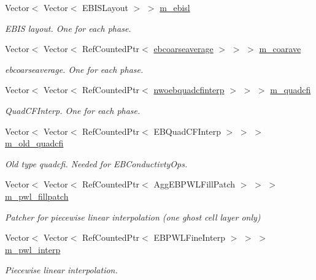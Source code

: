 \begin{DoxyCompactItemize}
Vector$<$ Vector$<$ E\+B\+I\+S\+Layout $>$ $>$ \hyperlink{classamr__mesh_ad46c16526616b96bac5ac7345618424a}{m\+\_\+ebisl}
\begin{DoxyCompactList}\small\item\em E\+B\+IS layout. One for each phase. \end{DoxyCompactList}\item 
Vector$<$ Vector$<$ Ref\+Counted\+Ptr$<$ \hyperlink{classebcoarseaverage}{ebcoarseaverage} $>$ $>$ $>$ \hyperlink{classamr__mesh_af8751335c6b5d0dbd665cad39ea487f5}{m\+\_\+coarave}
\begin{DoxyCompactList}\small\item\em ebcoarseaverage. One for each phase. \end{DoxyCompactList}\item 
Vector$<$ Vector$<$ Ref\+Counted\+Ptr$<$ \hyperlink{classnwoebquadcfinterp}{nwoebquadcfinterp} $>$ $>$ $>$ \hyperlink{classamr__mesh_a48b66992edba04104b2c825fa781b456}{m\+\_\+quadcfi}
\begin{DoxyCompactList}\small\item\em Quad\+C\+F\+Interp. One for each phase. \end{DoxyCompactList}\item 
Vector$<$ Vector$<$ Ref\+Counted\+Ptr$<$ E\+B\+Quad\+C\+F\+Interp $>$ $>$ $>$ \hyperlink{classamr__mesh_a94acf57b52f92a8ef5aee7b2ccb0239a}{m\+\_\+old\+\_\+quadcfi}
\begin{DoxyCompactList}\small\item\em Old type quadcfi. Needed for E\+B\+Conductivty\+Ops. \end{DoxyCompactList}\item 
Vector$<$ Vector$<$ Ref\+Counted\+Ptr$<$ Agg\+E\+B\+P\+W\+L\+Fill\+Patch $>$ $>$ $>$ \hyperlink{classamr__mesh_add41fea333026b33f25ae039bad5c55a}{m\+\_\+pwl\+\_\+fillpatch}
\begin{DoxyCompactList}\small\item\em Patcher for piecewise linear interpolation (one ghost cell layer only) \end{DoxyCompactList}\item 
Vector$<$ Vector$<$ Ref\+Counted\+Ptr$<$ E\+B\+P\+W\+L\+Fine\+Interp $>$ $>$ $>$ \hyperlink{classamr__mesh_abd395ab434bb13965d41421f995b2da7}{m\+\_\+pwl\+\_\+interp}
\begin{DoxyCompactList}\small\item\em Piecewise linear interpolation. \end{DoxyCompactList}\item 

\end{DoxyCompactItemize}
